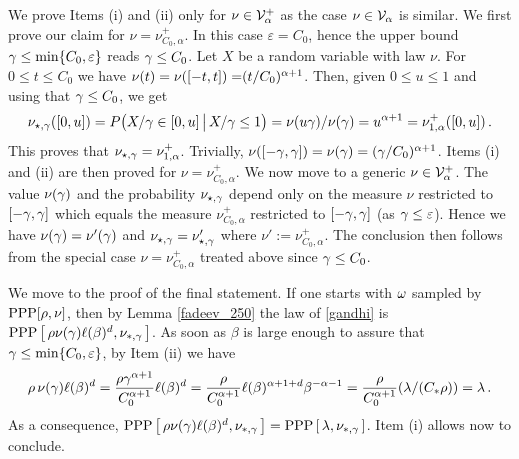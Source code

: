 \documentclass[12pt,a4paper,reqno]{amsart}
\newcommand{\cV}{\ensuremath{\mathcal V}}
\let\a=\alpha \let\b=\beta   \let\d=\delta  \let\e=\varepsilon
\newcommand{\rosso}{\textcolor{black}} %
\newcommand{\cv}{\rosso{\cV_\alpha}}
\newcommand{\cvp}{\rosso{\cV^+_\alpha}}
\begin{document}
We prove Items (i) and (ii) only for $\nu \in \cvp$ as the case $\nu \in \cv$ is similar.
 We first prove our claim for $\nu=\nu_{C_0,\a}^+$. In this case  $\e=C_0$, hence the upper bound  $\g \leq \min\{C_0, \e\}$ reads $\gamma\leq C_0$.
 Let $X$ be a random variable with law $\nu$. For $0 \leq t \leq C_0$ we have $\nu(t)=\rosso{\nu([-t,t])=}(t/C_0)^{\a+1}$. Then, 
given $0\leq u \leq 1$ and  using that  $\gamma \leq C_0$, we get 
 \begin{equation*}
 \nu_{\star,\g} ([0,u])= P\bigl(  X/\g\in [0,u]\,\big{|}\, X/\g \leq 1\bigr) =  \nu ( u\g)/\nu(\g)   =  u^{\a+1}=\nu^+_{1,\a} (  [0,u])\,.
  \end{equation*}
  This proves  that $  \nu_{\star,\g} =\nu^+_{1,\a}$.  Trivially, $\nu([-\g, \g])= \nu(\g)=(\g/C_0)^{\a+1}$.   Items (i) and (ii) are  then proved for $\nu=  \nu_{C_0,\a}^+$.
 We now move to a generic $\nu\in \cvp$. The value $\nu(\gamma)$ and the probability  $\nu_{\star,  \gamma}$ depend only on the measure $\nu$ restricted to $[-\gamma,\gamma]$  which equals the measure
 $\nu_{C_0,\a}^+$ restricted to $[-\gamma,\gamma]$ (as $\g\leq \e$). Hence  
    we have  $\nu(\gamma)=\nu'(\gamma)$  and  $\nu_{\star,  \gamma}=\nu'_{\star,  \gamma}$ where $\nu':=\nu_{C_0,\a}^+$.  The conclusion then follows from the special case 
 $\nu=\nu_{C_0,\a}^+$ treated above since $\gamma\leq C_0$.
 
 
  

\smallskip
We move to the proof of  the final statement.
If one starts with $\omega$ sampled by  ${\rm PPP}[\rho, \nu]$, then by Lemma \ref{fadeev_250}
%
%
%
 the law of \eqref{gandhi} is $
{\rm PPP}\left[\,\rho \nu( \g ) \ell(\b)^d  , \nu_{*,\g} \,\right]$.
As soon as  $\b$ is  large enough to assure that  $\g\leq \min\{C_0,\e\}$,  by Item (ii) we have 
\[
\rho \,\nu( \g ) \ell(\b)^d = \frac{\rho \g^{\a+1}}{C_0^{\a+1}} \ell(\b)^d= \frac{\rho}{ C_0^{\a+1}} \ell(\b)^{\a+1+d} \b^{-\a-1}= \frac{\rho}{ C_0^{\a+1}}   (\l/(C_*\rho) )=\l\,.\]
As a consequence, $
{\rm PPP}\left[\,\rho \nu( \g ) \ell(\b)^d  , \nu_{*,\g} \,\right]=
{\rm PPP}\left[\,\l , \nu_{*,\g} \,\right]$. Item (i) allows now to conclude.
\end{document}
